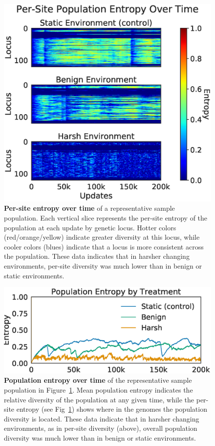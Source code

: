 \documentclass[10pt,letterpaper,final]{article}
\begin{document}
	\begin{figure}[!h]
	\includegraphics[width=0.75\columnwidth]{figures/CE/fig4.eps}
	\caption{\textbf{Per-site entropy over time} of a representative sample population. Each vertical slice represents the per-site entropy of the population at each update by genetic locus. Hotter colors (red/orange/yellow) indicate greater diversity at this locus, while cooler colors (blues) indicate that a locus is more consistent across the population. These data indicates that in harsher changing environments, per-site diversity was much lower than in benign or static environments.   
	}\label{fig:by-site-entropy}
	\end{figure}

	\begin{figure}[!h]
	\includegraphics[width=0.75\columnwidth]{figures/CE/fig5.eps}
	\caption{\textbf{Population entropy over time} of the representative sample population in Figure~\ref{fig:by-site-entropy}. Mean population entropy indicates the relative diversity of the population at any given time, while the per-site entropy (see Fig~\ref{fig:by-site-entropy}) shows where in the genomes the population diversity is located.  These data indicate that in harsher changing environments, as in per-site diversity (above), overall population diversity was much lower than in benign or static environments.
	}\label{fig:population-entropy}
	\end{figure}
\end{document}
